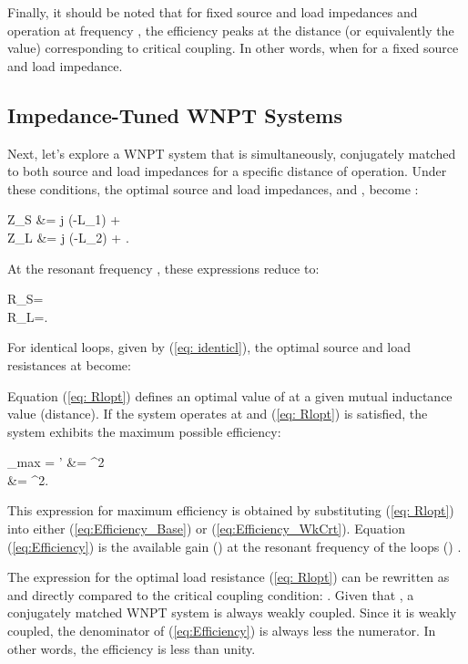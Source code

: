 \documentclass[journal]{IEEEtran}
\begin{document}
Finally, it should be noted that for fixed source and load impedances and operation at frequency , the efficiency peaks at the distance (or equivalently the  value) corresponding to critical coupling. In other words,  when  for  a fixed source and load impedance.

\subsection{Impedance-Tuned WNPT Systems}
\label{sec:CCImpMatch}

Next, let's explore a WNPT system that is simultaneously, conjugately matched to both source and load impedances for a specific distance of operation. Under these conditions, the optimal source and load impedances,  and , become \cite{Thomas}:

Z_S &= j \left(-\omega L_1\right) + 
\label{eq:OptZs} \\
Z_L &= j \left(-\omega L_2\right) + .
\label{eq:OptZL}

At the resonant frequency , these expressions reduce to:

R_S=
\label{eq:ZS_at_Res} \\
R_L=.
\label{eq:ZL_at_Res}

For identical loops, given by (\ref{eq: identicl}), the optimal source and load resistances at  become:

Equation (\ref{eq: Rlopt}) defines an optimal value of  at a given mutual inductance value (distance). If the system operates at  and (\ref{eq: Rlopt}) is satisfied, the system exhibits the maximum possible efficiency:

\eta_{max} =  \eta' &= ^2 \\
&= ^2.
\label{eq:Efficiency}

This expression for maximum efficiency is obtained by substituting (\ref{eq: Rlopt}) into either (\ref{eq:Efficiency_Base}) or (\ref{eq:Efficiency_WkCrt}). Equation (\ref{eq:Efficiency}) is the available gain () at the resonant frequency of the loops () \cite{Pozar}.

The expression for the optimal load resistance (\ref{eq: Rlopt}) can be rewritten as  and directly compared to the critical coupling condition: . Given that , a conjugately matched WNPT system is always weakly coupled. Since it is weakly coupled, the denominator of (\ref{eq:Efficiency}) is always less the numerator. In other words, the efficiency is less than unity.
\end{document}
